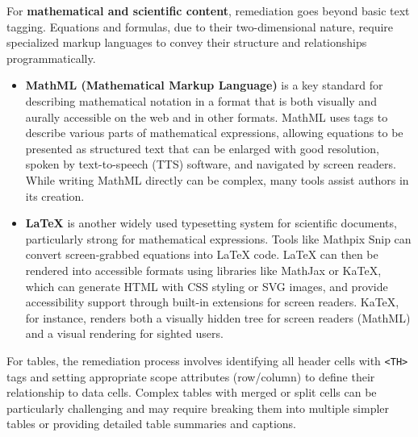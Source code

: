 For \textbf{mathematical and scientific content}, remediation goes beyond basic text tagging. Equations and formulas, due to their two-dimensional nature, require specialized markup languages to convey their structure and relationships programmatically.
\begin{itemize}
    \item \textbf{MathML (Mathematical Markup Language)} is a key standard for describing mathematical notation in a format that is both visually and aurally accessible on the web and in other formats. MathML uses tags to describe various parts of mathematical expressions, allowing equations to be presented as structured text that can be enlarged with good resolution, spoken by text-to-speech (TTS) software, and navigated by screen readers. While writing MathML directly can be complex, many tools assist authors in its creation.
    \item \textbf{LaTeX} is another widely used typesetting system for scientific documents, particularly strong for mathematical expressions. Tools like Mathpix Snip can convert screen-grabbed equations into LaTeX code. LaTeX can then be rendered into accessible formats using libraries like MathJax or KaTeX, which can generate HTML with CSS styling or SVG images, and provide accessibility support through built-in extensions for screen readers. KaTeX, for instance, renders both a visually hidden tree for screen readers (MathML) and a visual rendering for sighted users.
\end{itemize}

For tables, the remediation process involves identifying all header cells with \texttt{<TH>} tags and setting appropriate scope attributes (row/column) to define their relationship to data cells. Complex tables with merged or split cells can be particularly challenging and may require breaking them into multiple simpler tables or providing detailed table summaries and captions.

